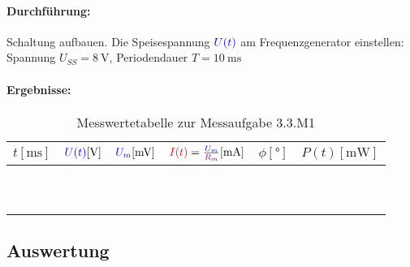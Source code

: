 \documentclass[11pt,a4paper,titlepage,parskip=half]{scrreprt}
\begin{document}
                   \paragraph{Durchführung:} Schaltung aufbauen. Die Speisespannung $\textcolor{blue}{U(t)}$ am Frequenzgenerator einstellen: Spannung $U_{SS} = \SI{8}{\volt}$, Periodendauer  $T = \SI{10}{\milli\second}$ 
                   \paragraph{Ergebnisse:}
                   \begin{center}
                       \begin{table}[!hbtp]
                           \caption{Messwertetabelle zur Messaufgabe 3.3.M1}
                           \label{tbl:messergebnisse3.1}
                           \renewcommand{\arraystretch}{1.6}
                           \begin{center}
                               \begin{tabular}{c|c|c|c|c|c}
									$t [\si{\milli\second}]$ & $\textcolor{blue}{U(t)} [\si{\volt}]$ & $\textcolor{blue}{U_m} [\si{\milli\volt}]$ & $\textcolor{red}{I(t)} = \frac{\textcolor{blue}{U_m}}{\textcolor{violet}{R_m}} [\si{\milli\ampere}]$ & $\phi [°]$ & $P(t) [\si{\milli\watt}]$\\ \hline
									\qquad\qquad\qquad & \qquad\qquad\qquad & \qquad\qquad\qquad & \qquad\qquad\qquad & \qquad\qquad\qquad & \qquad\qquad\qquad\\\hline
									 &  &  &  &  & \\\hline
									 &  &  &  &  & \\\hline
									 &  &  &  &  & \\\hline
									 &  &  &  &  & \\\hline
									 &  &  &  &  & \\\hline
									 &  &  &  &  & \\\hline
									 &  &  &  &  & \\\hline
									 &  &  &  &  & \\\hline
									 &  &  &  &  & \\
							   \end{tabular}
                           \end{center}
                       \end{table}
                   \end{center}
                   
                   
                   \subsection{Auswertung}
\end{document}
